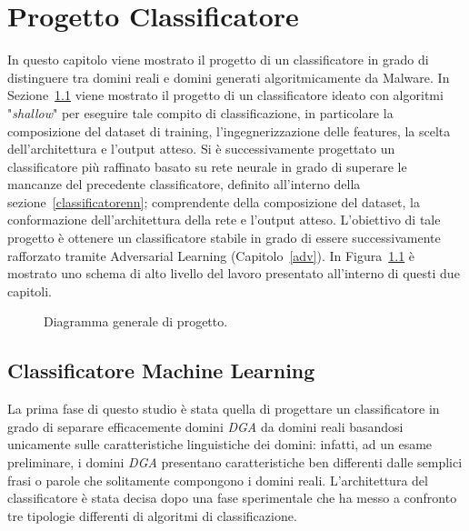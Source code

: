 \chapter{Progetto Classificatore}
\label{projclass}
In questo capitolo viene mostrato il progetto di un classificatore in grado di distinguere tra domini reali e domini generati algoritmicamente da Malware. In Sezione~\ref{proj:classml} viene mostrato il progetto di un classificatore ideato con algoritmi "\textit{shallow}" per eseguire tale compito di classificazione, in particolare la composizione del dataset di training, l'ingegnerizzazione delle features, la scelta dell'architettura e l'output atteso. 
Si è successivamente progettato un classificatore più raffinato basato su rete neurale in grado di superare le mancanze del precedente classificatore, definito all'interno della sezione~\ref{classificatorenn}; comprendente della composizione del dataset, la conformazione dell'architettura della rete e l'output atteso. L'obiettivo di tale progetto è ottenere un classificatore stabile in grado di essere successivamente rafforzato tramite Adversarial Learning (Capitolo~\ref{adv}). In Figura~\ref{fig:intro} è mostrato uno schema di alto livello del lavoro presentato all'interno di questi due capitoli.

\newpage
\begin{figure}[!hp]
    \centering
	
	\caption{Diagramma generale di progetto. \label{fig:intro}}
\end{figure}

\newpage
\section{Classificatore Machine Learning}
\label{proj:classml}
La prima fase di questo studio è stata quella di progettare un classificatore in grado di separare efficacemente domini \textit{DGA} da domini reali basandosi unicamente sulle caratteristiche linguistiche dei domini: infatti, ad un esame preliminare, i domini \textit{DGA} presentano caratteristiche ben differenti dalle semplici frasi o parole che solitamente compongono i domini reali.
L'architettura del classificatore è stata decisa dopo una fase sperimentale che ha messo a confronto tre tipologie differenti di algoritmi di classificazione.

